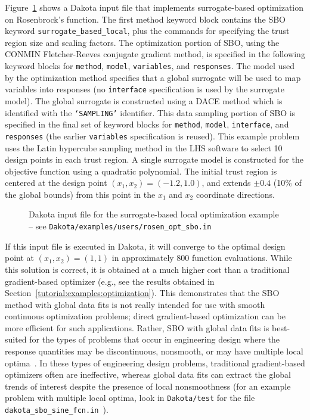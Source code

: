 Figure~\ref{sbm:sblm_rosen} shows a Dakota input file that implements
surrogate-based optimization on Rosenbrock's function.
The first method keyword block contains the SBO 
keyword \texttt{surrogate\_based\_local}, plus the commands for
specifying the trust region size and scaling factors. The optimization
portion of SBO, using the CONMIN Fletcher-Reeves conjugate gradient method,
is specified in the following keyword blocks for
\texttt{method}, \texttt{model}, \texttt{variables}, and
\texttt{responses}.  The model used by the optimization method 
specifies that a global surrogate will be used to map variables into
responses (no \texttt{interface} specification is used by the
surrogate model). The global surrogate is constructed using a DACE
method which is identified with the \texttt{`SAMPLING'} identifier.
This data sampling portion of SBO is specified in the final set of
keyword blocks for \texttt{method}, \texttt{model},
\texttt{interface}, and \texttt{responses} (the earlier 
\texttt{variables} specification is reused). This example problem uses 
the Latin hypercube sampling method in the LHS software to select 10
design points in each trust region. A single surrogate model is
constructed for the objective function using a quadratic polynomial.
The initial trust region is centered at the design point
$(x_1,x_2)=(-1.2,1.0)$, and extends $\pm 0.4$ (10\% of the global
bounds) from this point in the $x_1$ and $x_2$ coordinate directions.
\begin{figure}
  \begin{bigbox}
    \begin{tiny}
    \end{tiny}
  \end{bigbox}
  \caption{Dakota input file for the surrogate-based local optimization
    example --
see \texttt{Dakota/examples/users/rosen\_opt\_sbo.in} }
  \label{sbm:sblm_rosen}
\end{figure}

If this input file is executed in Dakota, it will converge to the
optimal design point at $(x_{1},x_{2})=(1,1)$ in approximately 800
function evaluations. While this solution is correct, it is obtained
at a much higher cost than a traditional gradient-based optimizer
(e.g., see the results obtained in Section~\ref{tutorial:examples:optimization}).
This demonstrates that the SBO method with global data fits is not
really intended for use with smooth continuous optimization problems;
direct gradient-based optimization can be more efficient for such
applications. Rather, SBO with global data fits is best-suited for the
types of problems that occur in engineering design where the response
quantities may be discontinuous, nonsmooth, or may have multiple local
optima~\cite{Giu02}. In these types of engineering design problems,
traditional gradient-based optimizers often are ineffective, whereas
global data fits can extract the global trends of interest despite the
presence of local nonsmoothness (for an example problem with multiple
local optima, look in \texttt{Dakota/test} for the file
\texttt{dakota\_sbo\_sine\_fcn.in}~\cite{Giu00}).

